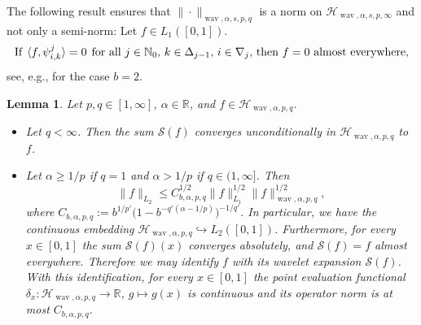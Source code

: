 \documentclass[12pt]{article}
\DeclareMathOperator{\wav}{wav}
\newtheorem{lemma}{Lemma}
\newcommand{\RR}{\mathbb{R}}
\newcommand{\HH}{\mathcal{H}}
\newcommand{\N}{\mathbb{N}}
\newcommand{\red}[1]{\textcolor{red}{#1}}
\begin{document}
The following result ensures that $\| \cdot \|_{\wav,\alpha,s,p,q}$ is a norm on 
$ \HH_{\wav,\alpha,s,p,\infty}$ and not only a semi-norm: Let $f\in L_1([0,1])$. 
\begin{equation}\label{cond_ensures_norm}
\text{If}\hspace{1ex} \langle f, \psi^j_{i,k} \rangle = 0 \hspace{1ex} \text{for all $j\in \N_0$, $k\in\Delta_{j-1}$, $i\in\nabla_j$, then $f=0$ almost everywhere,}
\end{equation}
see, e.g., \cite[Theorem~2.1(i)]{Tri10} for the case $b=2$.


\begin{lemma}\label{Rem_meaningful_1}
Let $p,q \in [1,\infty]$, $\alpha \in \RR$,  and $f \in \mathcal{H}_{\wav, \alpha,p,q}$. 
\begin{itemize}
\item[(i)] Let $q <\infty$. Then the sum $\mathcal{S}(f)$ 
converges unconditionally in $\HH_{\wav,\alpha,p,q}$ to $f$.
\item[(ii)] Let $\alpha \ge 1/p$ if $q=1$ and $\alpha>1/p$ if $q\in (1,\infty]$. 
Then 
\begin{equation}\label{est_L2_L1_Hwav}
\|f\|_{L_2} \le C^{1/2}_{b,\alpha,p,q}  \|f\|_{L_1}^{1/2} \|f\|^{1/2}_{\wav,\alpha,p,q},
\end{equation}
where  $C_{b,\alpha,p,q} := b^{1/p'} \big( 1-b^{-q'(\alpha -1/p)} \big)^{-1/q'}$.
In particular, we have the continuous embedding 
$\HH_{\wav,\alpha,p,q} \hookrightarrow L_2([0,1])$.
Furthermore, for every $x\in [0,1]$ the sum
$\mathcal{S}(f)(x)$ converges absolutely, and $\mathcal{S}(f) = f$ almost everywhere.
Therefore we may identify $f$ with its wavelet expansion $\mathcal{S}(f)$.
With this identification, for every $x\in [0,1]$ the point evaluation functional $\delta_x: \HH_{\wav,\alpha,p,q} \to \RR$, $g\mapsto g(x)$ is continuous and its operator norm is at most $C_{b,\alpha,p,q}$. 
\end{itemize}
\end{lemma}
\end{document}
